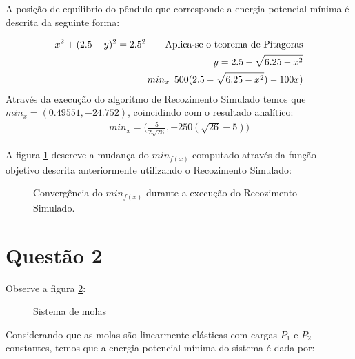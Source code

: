 \documentclass[fleqn, 11pt]{article}
\begin{document}
A posição de equílibrio do pêndulo que corresponde a energia potencial mínima é descrita da seguinte forma:

\begin{align*}
x^2 + (2.5 - y)^2 = 2.5^2 \tag*{Aplica-se o teorema de Pítagoras} \\
y = 2.5 - \sqrt{6.25 - x^2} \\
{min}_{x}\text{\phantom{0}} 500 (2.5 - \sqrt{6.25-x^2})-100x)
\end{align*}
Através da execução do algoritmo de Recozimento Simulado temos que ${min}_{x} = (0.49551,-24.752)$, coincidindo com o resultado analítico:
\begin{align*}
{min}_{x} = \bigg ( \frac{5}{2 \sqrt{26}}, -250 (\sqrt{26}-5) \bigg )
\end{align*}

A figura \ref{figure:fig2} descreve a mudança do ${min}_{f(x)}$ computado através da função objetivo descrita anteriormente utilizando o Recozimento Simulado:

\begin{figure}[!htb]
\label{figure:fig2}
   \caption{Convergência do ${min}_{f(x)}$ durante a execução do Recozimento Simulado.}
\end{figure}

\section{Questão 2}
Observe a figura \ref{figure:fig3}:
\begin{figure}[H]
\label{figure:fig3}
   \caption{Sistema de molas}
\end{figure}
Considerando que as molas são linearmente elásticas com cargas $P_1$ e $P_2$ constantes, temos que a energia potencial mínima do sistema é dada por:
\end{document}
